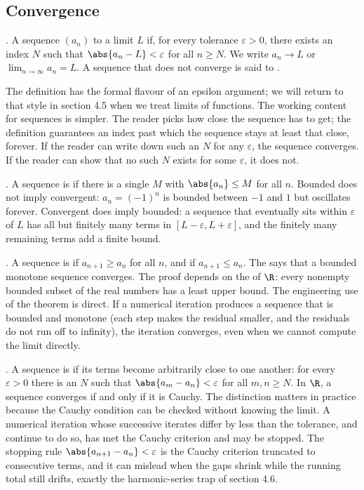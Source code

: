 \subsection{Convergence}

. A sequence $(a_{n})$  to a
limit $L$ if, for every tolerance $\varepsilon > 0$, there exists an
index $N$ such that $\abs{a_{n} - L} < \varepsilon$ for all $n \geq N$.
We write $a_{n} \to L$ or $\lim_{n \to \infty} a_{n} = L$. A sequence
that does not converge is said to .

The definition has the formal flavour of an epsilon argument; we will
return to that style in section 4.5 when we treat limits of functions.
The working content for sequences is simpler. The reader picks how close
the sequence has to get; the definition guarantees an index past which
the sequence stays at least that close, forever. If the reader can write
down such an $N$ for any $\varepsilon$, the sequence converges. If the
reader can show that no such $N$ exists for some $\varepsilon$, it does
not.

. A sequence is  if there is a single
$M$ with $\abs{a_{n}} \leq M$ for all $n$. Bounded does not imply
convergent: $a_{n} = (-1)^{n}$ is bounded between $-1$ and $1$ but
oscillates forever. Convergent does imply bounded: a sequence that
eventually sits within $\varepsilon$ of $L$ has all but finitely many
terms in $[L - \varepsilon, L + \varepsilon]$, and the finitely many
remaining terms add a finite bound.

. A sequence is  if
$a_{n+1} \geq a_{n}$ for all $n$, and  if
$a_{n+1} \leq a_{n}$. The  says
that a bounded monotone sequence converges. The proof depends on the
 of $\R$: every nonempty bounded subset of the
real numbers has a least upper bound. The engineering use of the
theorem is direct. If a numerical iteration produces a sequence that
is bounded and monotone (each step makes the residual smaller, and the
residuals do not run off to infinity), the iteration converges, even
when we cannot compute the limit directly.

. A sequence is  if its terms become
arbitrarily close to one another: for every $\varepsilon > 0$ there is
an $N$ such that $\abs{a_{m} - a_{n}} < \varepsilon$ for all
$m, n \geq N$. In $\R$, a sequence converges if and only if it is
Cauchy. The distinction matters in practice because the Cauchy
condition can be checked without knowing the limit. A numerical
iteration whose successive iterates differ by less than the tolerance,
and continue to do so, has met the Cauchy criterion and may be
stopped. The stopping rule $\abs{a_{n+1} - a_{n}} < \varepsilon$ is the
Cauchy criterion truncated to consecutive terms, and it can mislead
when the gaps shrink while the running total still drifts, exactly the
harmonic-series trap of section 4.6.

